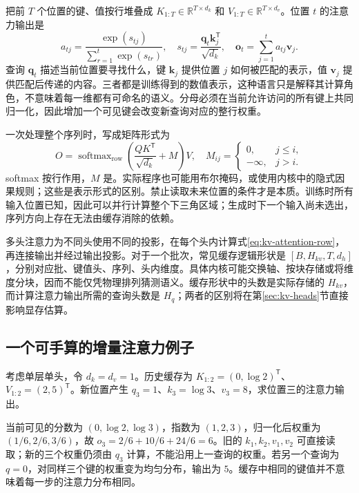 \documentclass[UTF8,12pt,a4paper,fontset=fandol]{ctexart}
\begin{document}
把前 $T$ 个位置的键、值按行堆叠成 $K_{1:T}\in\mathbb R^{T\times d_k}$ 和 $V_{1:T}\in\mathbb R^{T\times d_v}$。位置 $t$ 的注意力输出是
\begin{equation}
 a_{tj}=\frac{\exp(s_{tj})}{\sum_{r=1}^{t}\exp(s_{tr})},\quad
 s_{tj}=\frac{\mathbf q_t\mathbf k_j^{\mathsf T}}{\sqrt{d_k}},\quad
 \mathbf o_t=\sum_{j=1}^{t}a_{tj}\mathbf v_j.
 \label{eq:kv-attention-row}
\end{equation}
查询 $\mathbf q_t$ 描述当前位置要寻找什么，键 $\mathbf k_j$ 提供位置 $j$ 如何被匹配的表示，值 $\mathbf v_j$ 提供匹配后传递的内容。三者都是训练得到的数值表示，这种语言只是解释其计算角色，不意味着每一维都有可命名的语义。分母必须在当前允许访问的所有键上共同归一化，因此增加一个可见键会改变新查询对应的整行权重。

一次处理整个序列时，写成矩阵形式为
\begin{equation}
 O=\operatorname{softmax}_{\mathrm{row}}
 \left(\frac{QK^{\mathsf T}}{\sqrt{d_k}}+M\right)V,
 \quad M_{ij}=\begin{cases}0,&j\leq i,\\-\infty,&j>i.\end{cases}
 \label{eq:kv-masked-attention}
\end{equation}
softmax 按行作用，$M$ 是。实际程序也可能用布尔掩码，或使用内核中的隐式因果规则；这些是表示形式的区别。禁止读取未来位置的条件才是本质。训练时所有输入位置已知，因此可以并行计算整个下三角区域；生成时下一个输入尚未选出，序列方向上存在无法由缓存消除的依赖。

多头注意力为不同头使用不同的投影，在每个头内计算式\eqref{eq:kv-attention-row}，再连接输出并经过输出投影。对于一个批次，常见缓存逻辑形状是 $[B,H_{kv},T,d_h]$，分别对应批、键值头、序列、头内维度。具体内核可能交换轴、按块存储或将维度分块，因而不能仅凭物理排列猜测语义。缓存形状中的头数是实际存储的 $H_{kv}$，而计算注意力输出所需的查询头数是 $H_q$；两者的区别将在第\ref{sec:kv-heads}节直接影响显存估算。

\subsection{一个可手算的增量注意力例子}

\begin{example}[相同历史键值面对新的查询]
考虑单层单头，令 $d_k=d_v=1$。历史缓存为 $K_{1:2}=(0,\log 2)^{\mathsf T}$、$V_{1:2}=(2,5)^{\mathsf T}$。新位置产生 $q_3=1$、$k_3=\log 3$、$v_3=8$，求位置三的注意力输出。
\end{example}
\begin{solve}
当前可见的分数为 $(0,\log 2,\log 3)$，指数为 $(1,2,3)$，归一化后权重为 $(1/6,2/6,3/6)$，故 $o_3=2/6+10/6+24/6=6$。旧的 $k_1,k_2,v_1,v_2$ 可直接读取；新的三个权重仍须由 $q_3$ 计算，不能沿用上一查询的权重。若另一个查询为 $q=0$，对同样三个键的权重变为均匀分布，输出为 $5$。缓存中相同的键值并不意味着每一步的注意力分布相同。
\end{solve}
\end{document}
